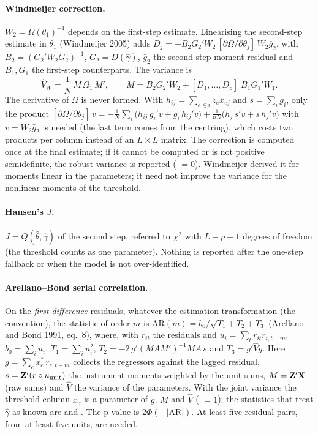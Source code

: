 \paragraph{Windmeijer correction.} $W_2=\Omega(\theta_1)^{-1}$ depends on the first-step estimate.
Linearising the second-step estimate in $\theta_1$ (Windmeijer 2005) adds
$D_j=-B_2G_2'W_2\,[\partial\Omega/\partial\theta_j]\,W_2\bar g_2$, with $B_2=(G_2'W_2G_2)^{-1}$,
$G_2=D(\hat\gamma)$, $\bar g_2$ the second-step moment residual and $B_1,G_1$ the first-step
counterparts. The variance is
\begin{equation}\label{eq:wind}
\widehat V_W=\frac1N\,M\,\Omega_1\,M',\qquad M=B_2G_2'W_2+[D_1,\dots,D_p]\;B_1G_1'W_1 .
\end{equation}
The derivative of $\Omega$ is never formed. With $h_{ij}=\sum_{e\in i}z_ex_{ej}$ and
$s=\sum_ig_i$, only the product
$[\partial\Omega/\partial\theta_j]\,v=-\frac1N\sum_i\bigl(h_{ij}\,g_i'v+g_i\,h_{ij}'v\bigr)
+\frac{1}{nN}\bigl(h_j\,s'v+s\,h_j'v\bigr)$ with $v=W_2\bar g_2$ is needed (the last term comes from the
centring), which costs two products per column instead of an $L\times L$ matrix. The correction is
computed once at the final estimate; if it cannot be computed or is not positive semidefinite, the
robust variance is reported ( $=0$). Windmeijer derived it for moments linear
in the parameters; it need not improve the variance for the nonlinear moments of the threshold.

\paragraph{Hansen's $J$.} $J=Q(\hat\theta,\hat\gamma)$ of the second step, referred to $\chi^2$ with
$L-p-1$ degrees of freedom (the threshold counts as one parameter). Nothing is reported after the
one-step fallback or when the model is not over-identified.

\paragraph{Arellano--Bond serial correlation.} On the \emph{first-difference} residuals, whatever the
estimation transformation (the  convention), the statistic of order $m$ is
$\mathrm{AR}(m)=b_0/\sqrt{T_1+T_2+T_3}$ (Arellano and Bond 1991, eq.~8), where, with
$r_{it}$ the residuals and $u_i=\sum_t r_{it}r_{i,t-m}$,
$b_0=\sum_iu_i$, $T_1=\sum_iu_i^2$, $T_2=-2\,g'(MAM')^{-1}MA\,s$ and $T_3=g'\widehat V g$. Here
$g=\sum_e x^*_e\,r_{e,t-m}$ collects the regressors against the lagged residual, $s=\mathbf{Z}'(r\circ u_{\text{unit}})$
the instrument moments weighted by the unit sums, $M=\mathbf{Z}'\mathbf{X}$ (raw sums) and $\widehat V$ the variance
of the parameters. With the joint variance the threshold column $x_\gamma$ is a parameter of $g$, $M$ and
$\widehat V$ ( $=1$); the statistics that treat $\hat\gamma$ as known are
 and . The p-value is $2\Phi(-|\mathrm{AR}|)$. At least five
residual pairs, from at least five units, are needed.


